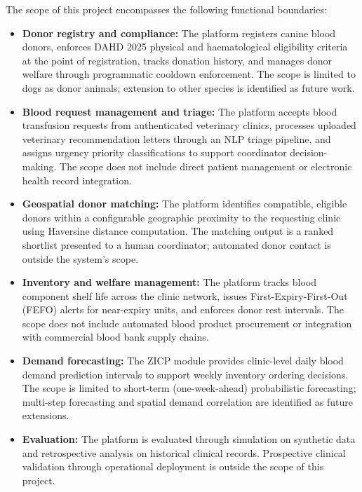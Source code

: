 \documentclass[12pt,a4paper]{article}
\begin{document}
\noindent The scope of this project encompasses the following functional boundaries:

\begin{itemize}[leftmargin=1.5em, itemsep=0.4em]
    \item \textbf{Donor registry and compliance:} The platform registers canine blood donors, enforces DAHD 2025 physical and haematological eligibility criteria at the point of registration, tracks donation history, and manages donor welfare through programmatic cooldown enforcement. The scope is limited to dogs as donor animals; extension to other species is identified as future work.
    \item \textbf{Blood request management and triage:} The platform accepts blood transfusion requests from authenticated veterinary clinics, processes uploaded veterinary recommendation letters through an NLP triage pipeline, and assigns urgency priority classifications to support coordinator decision-making. The scope does not include direct patient management or electronic health record integration.
    \item \textbf{Geospatial donor matching:} The platform identifies compatible, eligible donors within a configurable geographic proximity to the requesting clinic using Haversine distance computation. The matching output is a ranked shortlist presented to a human coordinator; automated donor contact is outside the system's scope.
    \item \textbf{Inventory and welfare management:} The platform tracks blood component shelf life across the clinic network, issues First-Expiry-First-Out (FEFO) alerts for near-expiry units, and enforces donor rest intervals. The scope does not include automated blood product procurement or integration with commercial blood bank supply chains.
    \item \textbf{Demand forecasting:} The ZICP module provides clinic-level daily blood demand prediction intervals to support weekly inventory ordering decisions. The scope is limited to short-term (one-week-ahead) probabilistic forecasting; multi-step forecasting and spatial demand correlation are identified as future extensions.
    \item \textbf{Evaluation:} The platform is evaluated through simulation on synthetic data and retrospective analysis on historical clinical records. Prospective clinical validation through operational deployment is outside the scope of this project.
\end{itemize}
\end{document}
